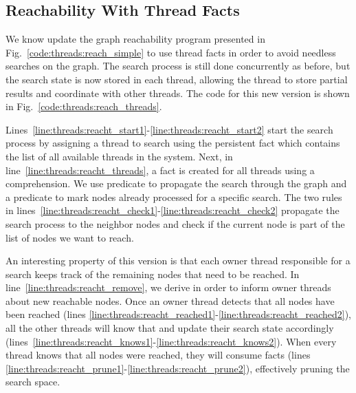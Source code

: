 \subsection{Reachability With Thread Facts}

We know update the graph reachability program presented in
Fig.~\ref{code:threads:reach_simple} to use thread facts in order to avoid
needless searches on the graph. The search process is still done concurrently as
before, but the search state is now stored in each thread, allowing the thread
to store partial results and coordinate with other threads. The code for this new
version is shown in Fig.~\ref{code:threads:reach_threads}.

Lines~\ref{line:threads:reacht_start1}-\ref{line:threads:reacht_start2} start
the search process by assigning a thread  to search  using
the persistent fact  which contains the list of all
available threads in the system. Next, in
line~\ref{line:threads:reacht_threads}, a fact  is created
for all threads using a comprehension. We use predicate  to
propagate the search through the graph and a predicate  to mark
nodes already processed for a specific search.  The two rules in
lines~\ref{line:threads:reacht_check1}-\ref{line:threads:reacht_check2}
propagate the search process to the neighbor nodes and check if the current node
is part of the list of nodes we want to reach.

An interesting property of this version is that each owner thread responsible
for a search keeps track of the remaining nodes that need to be reached. In
line~\ref{line:threads:reacht_remove}, we derive  in
order to inform owner threads about new reachable nodes. Once an owner thread
detects that all nodes have been reached (lines
\ref{line:threads:reacht_reached1}-\ref{line:threads:reacht_reached2}), all the
other threads will know that and update their search state accordingly
(lines~\ref{line:threads:reacht_knows1}-\ref{line:threads:reacht_knows2}). When
every thread knows that all nodes were reached, they will consume
 facts (lines
\ref{line:threads:reacht_prune1}-\ref{line:threads:reacht_prune2}), effectively
pruning the search space.

